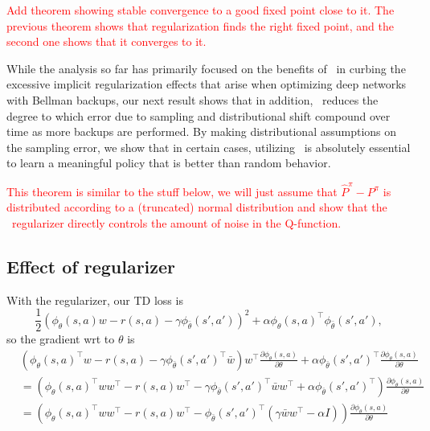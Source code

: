 \textcolor{red}{Add theorem showing stable convergence to a good fixed point close to it. The previous theorem shows that regularization finds the right fixed point, and the second one shows that it converges to it.}

While the analysis so far has primarily focused on the benefits of \methodname\ in curbing the excessive implicit regularization effects that arise when optimizing deep networks with Bellman backups, our next result shows that in addition, \methodname\ reduces the degree to which error due to sampling and distributional shift compound over time as more backups are performed. By making distributional assumptions on the sampling error, we show that in certain cases, utilizing \methodname\ is absolutely essential to learn a meaningful policy that is better than random behavior.

\textcolor{red}{This theorem is similar to the stuff below, we will just assume that $\hat{P}^\pi- P^\pi$ is distributed according to a (truncated) normal distribution and show that the \methodname\ regularizer directly controls the amount of noise in the Q-function.}

\subsection{Effect of regularizer}
With the regularizer, our TD loss is
\[ \frac{1}{2}\left(\phi_\theta(s, a)w - r(s, a) - \gamma\phi_{\bar{\theta}}(s', a')\right)^2 + \alpha \phi_\theta(s, a)^\top \phi_{\bar{\theta}}(s', a'),\]
so the gradient wrt to $\theta$ is
\begin{align*}
  &\left(\phi_\theta(s, a)^\top w - r(s, a) - \gamma\phi_{\bar{\theta}}(s', a')^\top \bar{w} \right)w^\top\frac{\partial \phi_\theta(s, a)}{\partial \theta} + \alpha \phi_{\bar{\theta}}(s', a')^\top\frac{\partial \phi_\theta(s, a)}{\partial \theta}\\
  &=\left(\phi_\theta(s, a)^\top ww^\top - r(s, a)w^\top - \gamma\phi_{\bar{\theta}}(s', a')^\top \bar{w}w^\top + \alpha\phi_{\bar{\theta}}(s', a')^\top \right)\frac{\partial \phi_\theta(s, a)}{\partial \theta} \\ 
  &=\left(\phi_\theta(s, a)^\top ww^\top - r(s, a)w^\top - \phi_{\bar{\theta}}(s', a')^\top \left(\gamma\bar{w}w^\top - \alpha I \right)\right)\frac{\partial \phi_\theta(s, a)}{\partial \theta} \\ 
\end{align*}
\fi


